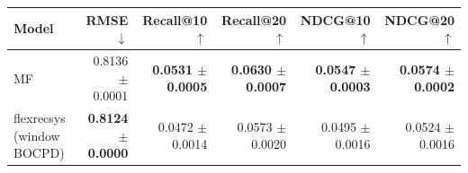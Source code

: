 \begin{tabular}{lrrrrr}
\toprule
Model & RMSE $\downarrow$ & Recall@10 $\uparrow$ & Recall@20 $\uparrow$ & NDCG@10 $\uparrow$ & NDCG@20 $\uparrow$ \\
\midrule
MF & 0.8136 $\pm$ 0.0001 & \textbf{0.0531 $\pm$ 0.0005} & \textbf{0.0630 $\pm$ 0.0007} & \textbf{0.0547 $\pm$ 0.0003} & \textbf{0.0574 $\pm$ 0.0002} \\
flexrecsys (window BOCPD) & \textbf{0.8124 $\pm$ 0.0000} & 0.0472 $\pm$ 0.0014 & 0.0573 $\pm$ 0.0020 & 0.0495 $\pm$ 0.0016 & 0.0524 $\pm$ 0.0016 \\
\bottomrule
\end{tabular}
